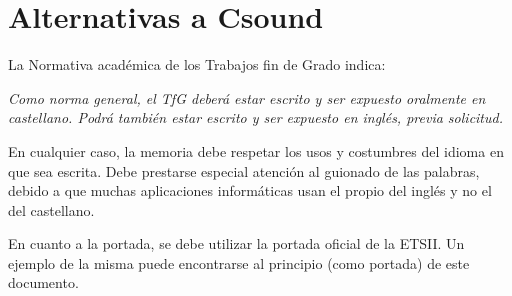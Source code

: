 \section{Alternativas a Csound}\label{sec:intro}

La Normativa académica de los Trabajos fin de Grado indica:

\emph{Como norma general, el TfG deberá estar escrito y ser expuesto oralmente en castellano.
Podrá también estar escrito y ser expuesto en inglés, previa solicitud.}

En cualquier caso, la memoria debe respetar los usos y costumbres del idioma en que sea escrita.
Debe prestarse especial atenci\'on al guionado de las palabras, debido a que muchas aplicaciones inform\'aticas
usan el propio del ingl\'es y no el del castellano.

En cuanto a la portada, se debe utilizar la portada oficial de la ETSII. Un ejemplo de la misma puede encontrarse al 
principio (como portada) de este documento.


 
